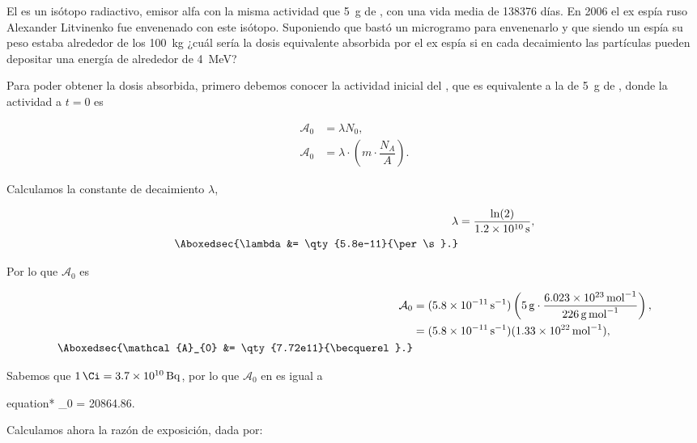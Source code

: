 \documentclass[./../main.tex]{subfiles}
\begin{document}
	\begin{exercise}
		El  es un isótopo radiactivo, emisor alfa con la misma actividad que \qty{5}{\g} de , con una vida media de \num{138376} días. En 2006 el ex espía ruso Alexander Litvinenko fue envenenado con este isótopo. Suponiendo que bastó un microgramo para envenenarlo y que siendo un espía su peso estaba alrededor de los \qty{100}{\kg} ¿cuál sería la dosis equivalente absorbida por el ex espía si en cada decaimiento las partículas pueden depositar una energía de alrededor de \qty{4}{\MeV}?

		\begin{solution}
			Para poder obtener la dosis absorbida, primero debemos conocer la actividad inicial del , que es equivalente a la de \qty{5}{\g} de , donde la actividad a \(t = 0\) es

			\begin{align*}
				\mathcal{A}_{0} &= \lambda N_{0},\\
				\mathcal{A}_{0} &= \lambda\cdot\left(m\cdot\dfrac{N_{A}}{A}\right).
			\end{align*}

			Calculamos la constante de decaimiento \(\lambda\),

			\begin{align*}
				\lambda &= \dfrac{\ln(2)}{\qty{1.2e10}{\s}},\\
				\Aboxedsec{\lambda &= \qty{5.8e-11}{\per\s}.}
			\end{align*}

			Por lo que \(\mathcal{A}_{0}\) es

			\begin{align*}
				\mathcal{A}_{0} &= (\qty{5.8e-11}{\per\s})\left(\qty{5}{\g}\cdot\dfrac{\qty{6.023e23}{\per\mol}}{\qty{226}{\g\per\mol}}\right),\\
				&= (\qty{5.8e-11}{\per\s})(\qty{1.33e22}{\per\mol}),\\
				\Aboxedsec{\mathcal{A}_{0} &= \qty{7.72e11}{\becquerel}.}
			\end{align*}

			Sabemos que \(\qty{1}{\Ci} = \qty{3.7e10}{\becquerel}\), por lo que \(\mathcal{A}_{0}\) en \unit{\mCi} es igual a

			\begin{empheq}[box=\secbox]{equation*}
				_{0} = \qty{20864.86}{\mCi}.
			\end{empheq}

			Calculamos ahora la razón de exposición, dada por:


\end{solution}
\end{exercise}
\end{document}
